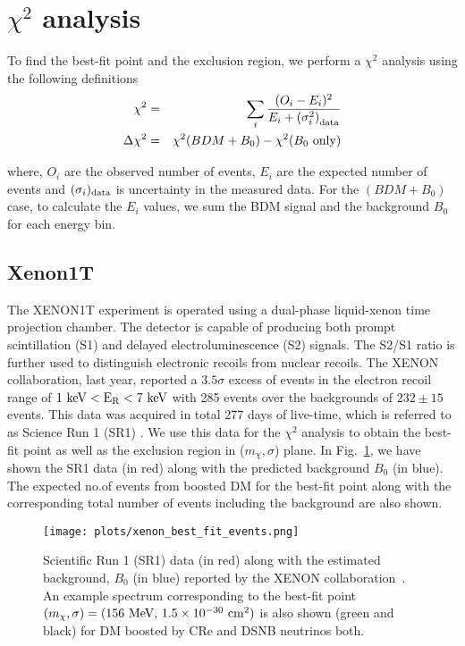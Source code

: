 \documentclass[11pt,prd,twocolumn,nofootinbib,reprint,superscriptaddress,longbibliography,colorlinks=true,citecolor=blue]{revtex4-1}
\def\bea{\begin{eqnarray}}
\def\eea{\end{eqnarray}}
\begin{document}
 
\section{$\chi^2$ analysis} 

 To find the best-fit point and the exclusion region, we perform a $\chi^2$ analysis using the following definitions
 \bea
 \chi^2 &=& \sum_{i} \frac{(O_i - E_i)^2}{E_i + \left(\sigma_i^2\right)_{\rm{data}}} \\
 \Delta \chi^2 &=& \chi^2(BDM+B_0)-\chi^2(B_0~\rm{only})
 \eea
 
 where, $O_i$ are the observed number of events, $E_i$ are the expected number of events and $(\sigma_i)_{\rm{data}}$ is uncertainty in the measured data. For the $(BDM+B_0)$ case, to calculate the $E_i$ values, we sum the BDM signal and the background $B_0$ for each energy bin. 
 
\subsection*{Xenon1T}
The XENON1T experiment is operated using a dual-phase liquid-xenon time projection chamber. The detector is capable of producing both prompt scintillation (S1) and delayed electroluminescence (S2) signals. The S2/S1 ratio is further used to distinguish electronic recoils from nuclear recoils. The XENON collaboration, last year, reported a $3.5\sigma$ excess of events in the electron recoil range of $1~\rm{keV} < E_R < 7~\rm{keV}$ with 285 events over the backgrounds of $232 \pm 15$ events. This data was acquired in total 277 days of live-time, which is referred to as Science Run 1 (SR1) \cite{XENON:2018voc,XENON:2020rca}. We use this data for the $\chi^2$ analysis to obtain the best-fit point as well as the exclusion region in ($m_\chi, \sigma$) plane. In Fig.~\ref{Fig:xenon_data}, we have shown the SR1 data (in red) along with the predicted background $B_0$ (in blue). The expected no.of events from boosted DM for the best-fit point along with the corresponding total number of events including the background are also shown. 

\begin{figure}
\centering
\texttt{[image: plots/xenon\_best\_fit\_events.png]}
\caption{Scientific Run 1 (SR1) data (in red) along with the estimated background, $B_0$ (in blue) reported by the XENON collaboration~\cite{XENON:2020rca}.
An example spectrum corresponding to the  best-fit point $(m_\chi, \sigma)=(156~\rm{MeV}, \, 1.5\times 10^{-30}~\rm{cm^2})$ is also shown (green and black) for DM boosted by CRe and DSNB neutrinos both.}
\protect\label{Fig:xenon_data}
\end{figure}
\end{document}
